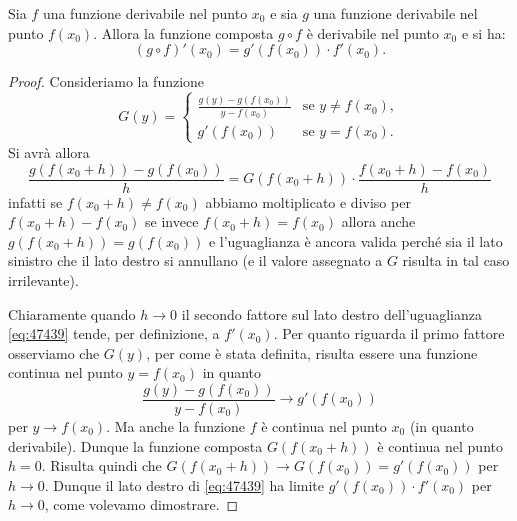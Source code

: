 \begin{theorem}
\mymark{**}
Sia $f$ una funzione derivabile nel punto $x_0$
e sia $g$ una funzione derivabile nel punto $f(x_0)$.
Allora la funzione composta $g\circ f$ è derivabile
nel punto $x_0$ e si ha:
\[
  (g\circ f)'(x_0) = g'(f(x_0))\cdot f'(x_0).
\]
\end{theorem}
%
\begin{proof}
\mymark{**}
Consideriamo la funzione
\[
  G(y) =
  \begin{cases}
   \frac{g(y) - g(f(x_0))}{y-f(x_0)} & \text{se $y \neq f(x_0)$},\\
   g'(f(x_0)) & \text{se $y=f(x_0)$}.
  \end{cases}
\]
Si avrà allora
\begin{equation}\label{eq:47439}
 \frac{g(f(x_0+h))-g(f(x_0))}{h}
 = G(f(x_0+h)) \cdot \frac{f(x_0+h)-f(x_0)}{h}
\end{equation}
infatti se $f(x_0+h)\neq f(x_0)$ abbiamo moltiplicato e diviso
per $f(x_0+h) - f(x_0)$ se invece $f(x_0+h)=f(x_0)$ allora anche $g(f(x_0+h))=g(f(x_0))$ e l'uguaglianza è ancora valida perché sia il lato sinistro che il lato destro si annullano (e il valore assegnato a $G$ risulta in tal caso irrilevante).

Chiaramente quando $h\to 0$ il secondo fattore sul lato destro
dell'uguaglianza \eqref{eq:47439}
tende, per definizione, a $f'(x_0)$.
Per quanto riguarda il primo fattore
osserviamo che $G(y)$, per come è stata definita, risulta essere una funzione continua nel punto $y=f(x_0)$ in quanto
\[
\frac{g(y) - g(f(x_0))}{y-f(x_0)} \to g'(f(x_0))
\]
per $y\to f(x_0)$.
Ma anche la funzione $f$ è continua nel punto $x_0$ (in quanto derivabile).
Dunque la funzione composta $G(f(x_0+h))$ è continua nel punto $h=0$.
Risulta quindi che $G(f(x_0+h)) \to G(f(x_0)) = g'(f(x_0))$ per $h\to 0$.
Dunque il lato destro di \eqref{eq:47439} ha limite $g'(f(x_0)) \cdot f'(x_0)$ per $h\to 0$, come volevamo dimostrare.
\end{proof}

